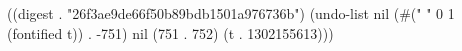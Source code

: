
((digest . "26f3ae9de66f50b89bdb1501a976736b") (undo-list nil (#(" " 0 1 (fontified t)) . -751) nil (751 . 752) (t . 1302155613)))
